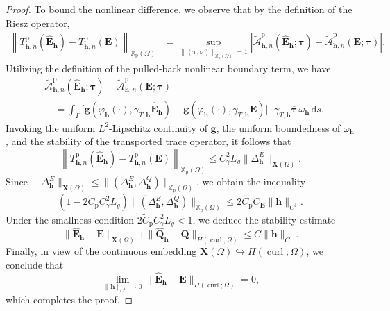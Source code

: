 \documentclass[12pt,reqno]{amsart}
\theoremstyle{definition}
\numberwithin{equation}{section}
\begin{document}
\begin{proof}
To bound the nonlinear difference, we observe that by the definition of the Riesz operator,
\[
\begin{aligned}
\left\| T_{\mathbf{h},n}^{\mathrm{p}}(\hat{\mathbf{E}}_{\mathbf{h}}) - T_{\mathbf{h},n}^{\mathrm{p}}(\mathbf{E}) \right\|_{\mathbb{X}_{\mathrm{p}}(\Omega)} &= \sup_{\|(\boldsymbol{\tau}, \boldsymbol{\nu})\|_{\mathbb{X}_{\mathrm{p}}(\Omega)}=1} \left| \widetilde{\mathcal{A}}_{\mathbf{h},n}^{\mathrm{p}}(\hat{\mathbf{E}}_{\mathbf{h}}; \boldsymbol{\tau}) - \widetilde{\mathcal{A}}_{\mathbf{h},n}^{\mathrm{p}}(\mathbf{E}; \boldsymbol{\tau}) \right|.
\end{aligned}
\]
Utilizing the definition of the pulled-back nonlinear boundary term, we have
\[
\begin{aligned}
&\widetilde{\mathcal{A}}_{\mathbf{h},n}^{\mathrm{p}}(\hat{\mathbf{E}}_{\mathbf{h}}; \boldsymbol{\tau}) - \widetilde{\mathcal{A}}_{\mathbf{h},n}^{\mathrm{p}}(\mathbf{E}; \boldsymbol{\tau}) \\
&\quad =  \int_\Gamma \Big[ \mathbf{g}(\varphi_{\mathbf{h}}(\cdot), \gamma_{T,\mathbf{h}} \hat{\mathbf{E}}_{\mathbf{h}}) - \mathbf{g}(\varphi_{\mathbf{h}}(\cdot), \gamma_{T,\mathbf{h}} \mathbf{E}) \Big] \cdot \gamma_{T,\mathbf{h}} \overline{\boldsymbol{\tau}} \, \omega_{\mathbf{h}} \, \mathrm{d}s.
\end{aligned}
\]
Invoking the uniform $L^2$-Lipschitz continuity of $\mathbf{g}$, the uniform boundedness of $\omega_{\mathbf{h}}$, and the stability of the transported trace operator, it follows that
\[
\left\| T_{\mathbf{h},n}^{\mathrm{p}}(\hat{\mathbf{E}}_{\mathbf{h}}) - T_{\mathbf{h},n}^{\mathrm{p}}(\mathbf{E}) \right\|_{\mathbb{X}_{\mathrm{p}}(\Omega)} \le C_\gamma^2 L_g \|\Delta_{\mathbf{h}}^E\|_{\mathbf{X}(\Omega)}.
\]
Since $\|\Delta_{\mathbf{h}}^E\|_{\mathbf{X}(\Omega)} \le \|(\Delta_{\mathbf{h}}^E, \Delta_{\mathbf{h}}^Q)\|_{\mathbb{X}_{\mathrm{p}}(\Omega)}$, we obtain the inequality
\[
\left( 1 - 2\widetilde{C}_{\mathrm{p}} C_\gamma^2 L_g \right) \|(\Delta_{\mathbf{h}}^E, \Delta_{\mathbf{h}}^Q)\|_{\mathbb{X}_{\mathrm{p}}(\Omega)} \le 2\widetilde{C}_{\mathrm{p}} C_{\mathbf{E}} \|\mathbf{h}\|_{C^1}.
\]
Under the smallness condition $2\widetilde{C}_{\mathrm{p}} C_\gamma^2 L_g < 1$, we deduce the stability estimate
\[
\|\hat{\mathbf{E}}_{\mathbf{h}} - \mathbf{E}\|_{\mathbf{X}(\Omega)} + \|\hat{\mathbf{Q}}_{\mathbf{h}} - \mathbf{Q}\|_{H(\operatorname{curl}; \Omega)} \le C \|\mathbf{h}\|_{C^1}.
\]
Finally, in view of the continuous embedding $\mathbf{X}(\Omega) \hookrightarrow H(\operatorname{curl}; \Omega)$, we conclude that
\[
\lim_{\|\mathbf{h}\|_{C^1} \to 0} \|\hat{\mathbf{E}}_{\mathbf{h}} - \mathbf{E}\|_{H(\operatorname{curl}; \Omega)} = 0,
\]
which completes the proof.


\end{proof}
\end{document}
